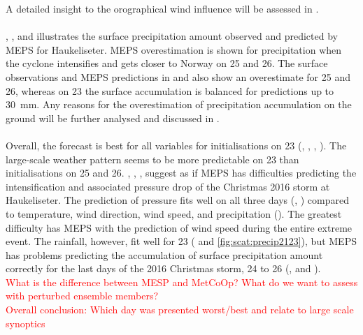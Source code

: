 A detailed insight to the orographical wind influence will be assessed in . 
\\
\\
, , and  illustrates the surface precipitation amount observed and predicted by MEPS for Haukeliseter. MEPS overestimation is shown for precipitation when the cyclone intensifies and gets closer to Norway on \num{25} and \SI{26}{\dec}. The surface observations and MEPS predictions in  and  also show an overestimate for \num{25} and \SI{26}{\dec}, whereas on \SI{23}{\dec} the surface accumulation is balanced for  predictions up to \SI{30}{\mm}. Any reasons for the overestimation of precipitation accumulation on the ground will be further analysed and discussed in .
\\
\\
Overall, the forecast is best for all variables for initialisations on \SI{23}{\dec} (, , , ). 
The large-scale weather pattern seems to be more predictable on \SI{23}{\dec} than initialisations on \num{25} and \SI{26}{\dec}. , , ,  suggest as if MEPS has difficulties predicting the intensification and associated pressure drop of the Christmas 2016 storm at Haukeliseter. The prediction of pressure fits well on all three days (, ) compared to temperature, wind direction, wind speed, and precipitation (). The greatest difficulty has MEPS with the prediction of wind speed during the entire extreme event. The rainfall, however, fit well for \SI{23}{\dec} ( and \ref{fig:scat:precip2123}), but MEPS has problems predicting the accumulation of surface precipitation amount correctly for the last days of the 2016 Christmas storm, \num{24} to \SI{26}{\dec} (,  and ).
\\
\textcolor{red}{
	What is the difference between MESP and MetCoOp? What do we want to assess with perturbed ensemble members?\\
	Overall conclusion: Which day was presented worst/best and relate to large scale synoptics}

